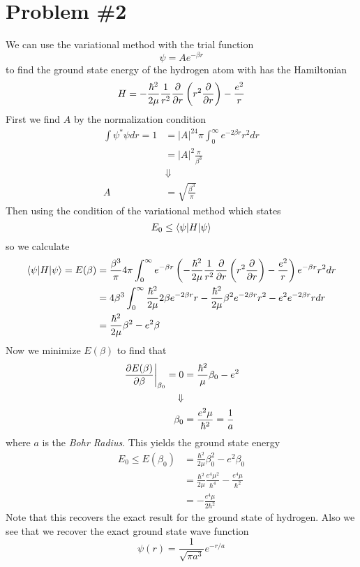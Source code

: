 \documentclass[11pt]{article}
\numberwithin{equation}{section}
\begin{document}
\pagebreak

\section{Problem \#2}
We can use the variational method with the trial function
$$\psi = Ae^{-\beta{r}}$$
to find the ground state energy of the hydrogen atom with has the Hamiltonian
$$H = -\frac{\hbar^2}{2\mu}\frac{1}{r^2}\frac{\partial{}}{\partial{r}}\left(r^2\frac{\partial{}}{\partial{r}}\right) - \frac{e^2}{r}$$ 
First we find $A$ by the normalization condition
\begin{align*}
\int\psi^*\psi{dr} = 1 &= |A|^24\pi\int_{0}^{\infty}e^{-2\beta{r}}r^2dr\\
&= |A|^2\frac{\pi}{\beta^3}\\
&\Downarrow\\
A &= \sqrt{\frac{\beta^{3}}{\pi}}
\end{align*}
Then using the condition of the variational method which states
$$E_0\le\langle{\psi}|H|{\psi}\rangle$$
so we calculate
\begin{align*}
\langle{\psi}|H|{\psi}\rangle = E(\beta) &= \frac{\beta^3}{\pi}4\pi\int_{0}^{\infty}e^{-\beta{r}}\left(-\frac{\hbar^2}{2\mu}\frac{1}{r^2}\frac{\partial{}}{\partial{r}}\left(r^2\frac{\partial{}}{\partial{r}}\right) - \frac{e^2}{r}\right)e^{-\beta{r}}r^2dr\\
&= 4\beta^3\int_{0}^{\infty}\frac{\hbar^2}{2\mu}2\beta{e^{-2\beta{r}}}r - \frac{\hbar^2}{2\mu}\beta^2e^{-2\beta{r}}r^2 - e^2e^{-2\beta{r}}rdr\\
&= \frac{\hbar^2}{2\mu}\beta^2 - e^2\beta
\end{align*}
Now we minimize $E(\beta)$ to find that
\begin{align*}
\left.\frac{\partial{E(\beta)}}{\partial{\beta}}\right|_{\beta_0} = 0 &= \frac{\hbar^2}{\mu}\beta_0 - e^2\\
\Downarrow\\
\beta_0 &= \frac{e^2\mu}{\hbar^2} = \frac{1}{a}
\end{align*}
where $a$ is the \emph{Bohr Radius}. This yields the ground state energy
\begin{align*}
E_0 \le E(\beta_0) &= \frac{\hbar^2}{2\mu}\beta_0^2 - e^2\beta_0\\
&= \frac{\hbar^2}{2\mu}\frac{e^4\mu^2}{\hbar^4} - \frac{e^4\mu}{\hbar^2}\\
&= -\frac{e^4\mu}{2\hbar^2}
\end{align*}
Note that this recovers the exact result for the ground state of hydrogen. Also we see that we
recover the exact ground state wave function
$$\psi(r) = \frac{1}{\sqrt{\pi{a^3}}}e^{-r/a}$$
\end{document}
